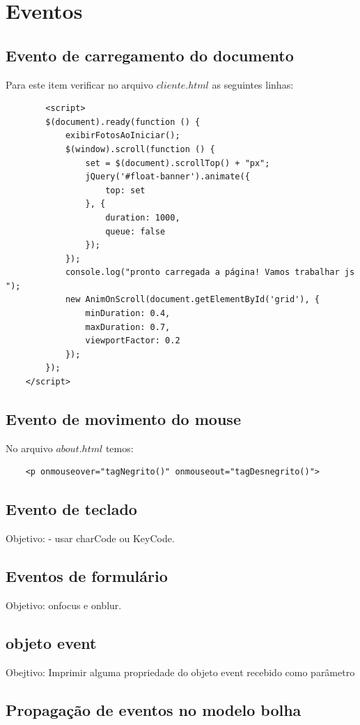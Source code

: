 \section{Eventos}

\subsection{Evento de carregamento do documento}
	Para este item verificar no arquivo $cliente.html$ as seguintes linhas:
	\begin{lstlisting}
	    <script>
        $(document).ready(function () {
            exibirFotosAoIniciar();
            $(window).scroll(function () {
                set = $(document).scrollTop() + "px";
                jQuery('#float-banner').animate({
                    top: set
                }, {
                    duration: 1000,
                    queue: false
                });
            });
            console.log("pronto carregada a página! Vamos trabalhar js ");
            new AnimOnScroll(document.getElementById('grid'), {
                minDuration: 0.4,
                maxDuration: 0.7,
                viewportFactor: 0.2
            });
        });
    </script>
	\end{lstlisting}
\subsection{Evento de movimento do mouse}
	No arquivo $about.html$ temos:
\begin{lstlisting}
	<p onmouseover="tagNegrito()" onmouseout="tagDesnegrito()">
\end{lstlisting}
\subsection{Evento de teclado}
 Objetivo:  - usar charCode ou KeyCode.
 
 
\subsection{Eventos de formulário}
Objetivo: onfocus e onblur.


\subsection{objeto event}
Obejtivo: Imprimir alguma propriedade do objeto event recebido como parâmetro

\subsection{Propagação de eventos no modelo bolha}


